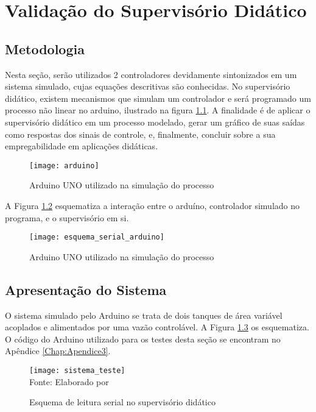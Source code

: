 \chapter{Validação do Supervisório Didático}

\section {Metodologia}

Nesta seção, serão utilizados 2 controladores devidamente sintonizados em um sistema simulado, cujas equações descritivas são conhecidas. No supervisório didático, existem mecanismos que simulam um controlador e será programado um processo não linear no arduino, ilustrado na figura \ref{img_arduino}. A finalidade é de aplicar o supervisório didático em um processo modelado, gerar um gráfico de suas saídas como respostas dos sinais de controle, e, finalmente, concluir sobre a sua empregabilidade em aplicações didáticas.

\begin{figure}[htb]
	\centering
	\caption{Arduino UNO utilizado na simulação do processo}
	\texttt{[image: arduino]}
	\label{img_arduino}
\end{figure}

A Figura \ref{img_esquema_arduino} esquematiza a interação entre o arduíno, controlador simulado no programa, e o supervisório em si.

\begin{figure}[htb]
	\centering
	\caption{Arduino UNO utilizado na simulação do processo}
	\texttt{[image: esquema\_serial\_arduino]}
	\label{img_esquema_arduino}
\end{figure}

\section{Apresentação do Sistema}

O sistema simulado pelo Arduino se trata de dois tanques de área variável acoplados e alimentados por uma vazão controlável. A Figura \ref{img_sistema_teste} os esquematiza. O código do Arduino utilizado para os testes desta seção se encontram no Apêndice \ref{Chap:Apendice3}.

\begin{figure}[htb]
	\centering
	\caption{Esquema de leitura serial no supervisório didático}
	\texttt{[image: sistema\_teste]} \\
	Fonte: Elaborado por 
	\label{img_sistema_teste}
\end{figure}

